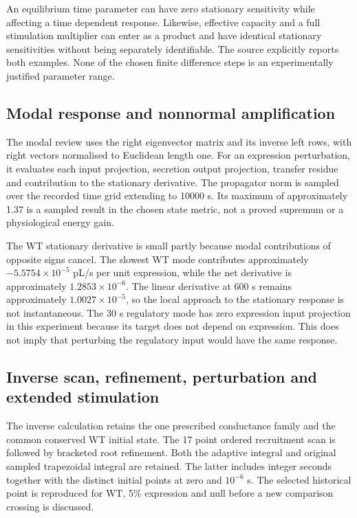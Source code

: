 An equilibrium time parameter can have zero stationary sensitivity while affecting a time dependent response. Likewise, effective capacity and a full stimulation multiplier can enter as a product and have identical stationary sensitivities without being separately identifiable. The source explicitly reports both examples. None of the chosen finite difference steps is an experimentally justified parameter range.

\subsection{Modal response and nonnormal amplification}
The modal review uses the right eigenvector matrix and its inverse left rows, with right vectors normalised to Euclidean length one. For an expression perturbation, it evaluates each input projection, secretion output projection, transfer residue and contribution to the stationary derivative. The propagator norm is sampled over the recorded time grid extending to 10000 s. Its maximum of approximately 1.37 is a sampled result in the chosen state metric, not a proved supremum or a physiological energy gain.

The WT stationary derivative is small partly because modal contributions of opposite signs cancel. The slowest WT mode contributes approximately $-5.5754\times10^{-5}$ pL/s per unit expression, while the net derivative is approximately $1.2853\times10^{-6}$. The linear derivative at 600 s remains approximately $1.0027\times10^{-5}$, so the local approach to the stationary response is not instantaneous. The 30 s regulatory mode has zero expression input projection in this experiment because its target does not depend on expression. This does not imply that perturbing the regulatory input would have the same response.

\subsection{Inverse scan, refinement, perturbation and extended stimulation}
The inverse calculation retains the one prescribed conductance family and the common conserved WT initial state. The 17 point ordered recruitment scan is followed by bracketed root refinement. Both the adaptive integral and original sampled trapezoidal integral are retained. The latter includes integer seconds together with the distinct initial points at zero and $10^{-6}$ s. The selected historical point is reproduced for WT, 5\% expression and null before a new comparison crossing is discussed.


